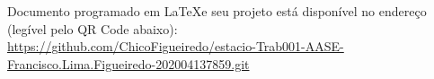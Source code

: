 
%
\begin{anexosenv}

\partanexos

Documento programado em \LaTeX  e seu projeto está disponível no endereço (legível pelo QR Code abaixo): \\ \url{https://github.com/ChicoFigueiredo/estacio-Trab001-AASE-Francisco.Lima.Figueiredo-202004137859.git} \\


\end{anexosenv}
